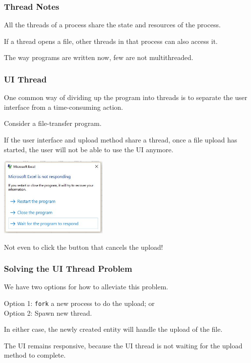 \begin{frame}
	\frametitle{Thread Notes}

	All the threads of a process share the state and resources of the process.

	If a thread opens a file, other threads in that process can also access it.

	The way programs are written now, few are not multithreaded.



\end{frame}

\begin{frame}
	\frametitle{UI Thread}

	One common way of dividing up the program into threads is to separate the user interface from a time-consuming action.

	Consider a file-transfer program.

	If the user interface and upload method share a thread, once a file upload has started, the user will not be able to use the UI anymore.
	
	\begin{center}
	\includegraphics[width=0.4\textwidth]{images/notresponding.png}
	\end{center}

	Not even to click the button that cancels the upload!

\end{frame}

\begin{frame}
	\frametitle{Solving the UI Thread Problem}

	We have two options for how to alleviate this problem.

	Option 1: \texttt{fork} a new process to do the upload; or \\
	Option 2: Spawn  new thread.

	In either case, the newly created entity will handle the upload of the file.

	The UI remains responsive, because the UI thread is not waiting for the upload method to complete.

\end{frame}


